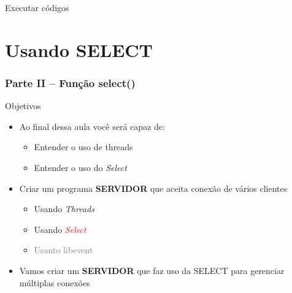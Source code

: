 \documentclass[10pt, xcolor=x11names]{beamer}
\begin{document}

\begin{frame}
	\centering
 	\Huge
	Executar códigos
\end{frame}

\section{Usando SELECT}
\begin{frame} \frametitle{Parte II -- Função select()}
	\begin{block}{Objetivos}
		\begin{itemize}
			\item Ao final dessa aula você será capaz de:
			\begin{itemize}
				\item Entender o uso de threads
				\item Entender o uso do \textit{Select}
			\end{itemize}
			\item Criar um programa \textbf{SERVIDOR} que aceita conexão de vários clientes
			\begin{itemize}
				\item Usando \textit{Threads}
				\item Usando \textcolor<2->{red}{\textit{Select}}
				\item \textcolor{gray}{Usanto libevent}
			\end{itemize}
		\end{itemize}
		\begin{itemize}
			\item<2-> Vamos criar um \textbf{SERVIDOR} que faz uso da SELECT para gerenciar múltiplas conexões
		\end{itemize}
	\end{block}
\end{frame}

\end{document}
